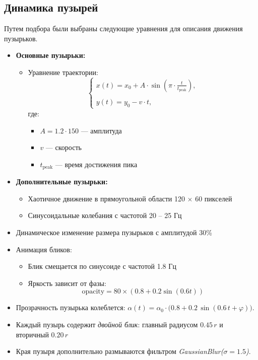 \documentclass[areasetadvanced]{scrartcl}
\begin{document}
\newpage
\subsection{Динамика пузырей}
Путем подбора были выбраны следующие уравнения для описания движения пузырьков.

\begin{itemize}
    \item \textbf{Основные пузырьки:}
    \begin{itemize}
        \item[] Уравнение траектории:
        \[
        \begin{cases}
            x(t) = x_0 + A \cdot \sin\left(\pi \cdot \frac{t}{t_{\text{peak}}}\right), \\\\
            y(t) = y_0 - v \cdot t,
        \end{cases}
        \]
        где:
        \begin{itemize}
            \item[] $A = 1.2 \cdot 150$ — амплитуда
            \item[] $v$ — скорость
            \item[] $t_{\text{peak}}$ — время достижения пика
        \end{itemize}
    \end{itemize}

    \item \textbf{Дополнительные пузырьки:}
    \begin{itemize}
        \item Хаотичное движение в прямоугольной области 120 $\times$ 60 пикселей
        \item Синусоидальные колебания с частотой 20 -- 25 Гц
    \end{itemize}
    \item Динамическое изменение размера пузырьков с амплитудой 30\%
    \item Анимация бликов:
    \begin{itemize}
        \item Блик смещается по синусоиде с частотой 1.8 Гц
        \item Яркость зависит от фазы:
        \[
            \text{opacity} = 80 \times (0.8 + 0.2 \sin(0.6 t))
        \]
    \end{itemize}
    \item Прозрачность пузырька колеблется: 
    $\alpha(t)=\alpha_0\!\cdot\!\bigl(0.8+0.2\,\sin(0.6\,t+\varphi)\bigr)$.
    \item Каждый пузырь содержит \emph{двойной блик}: 
    главный радиусом $0.45\,r$ и вторичный $0.20\,r$
    \item Края пузыря дополнительно размываются фильтром 
    \textit{GaussianBlur($\sigma =\!1.5$)}.
    \end{itemize}
\end{document}
